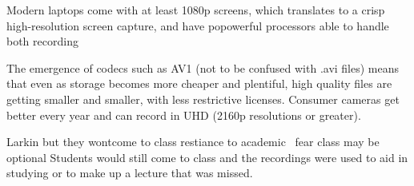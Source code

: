 \documentclass[sigconf]{acmart}
\begin{document}
Modern laptops come with at least 1080p screens, which translates to a crisp high-resolution screen capture, and have popowerful processors able to handle both recording 

The emergence of codecs such as AV1 \cite{AV1comp} (not to be confused with .avi files) means that even as storage becomes more cheaper and plentiful, high quality files are getting smaller and smaller, with less restrictive licenses. 
Consumer cameras get better every year and can record in UHD (2160p resolutions or greater).



Larkin but they wontcome to class restiance to academic \
fear class may be optional
Students would still come to class and the recordings were used to aid in studying or to make up a lecture that was missed.




\end{document}
